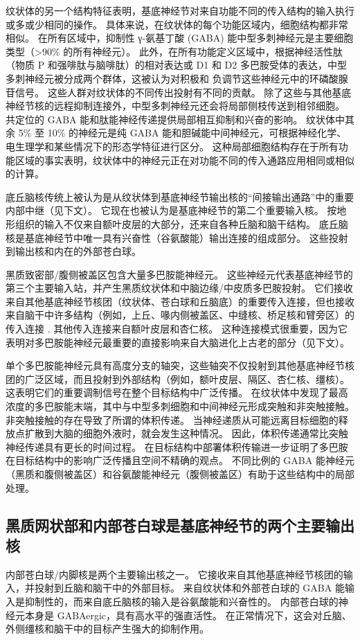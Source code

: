 纹状体的另一个结构特征表明，基底神经节对来自功能不同的传入结构的输入执行或多或少相同的操作。 具体来说，在纹状体的每个功能区域内，细胞结构都非常相似。 在所有区域中，抑制性 γ-氨基丁酸 (GABA) 能中型多刺神经元是主要细胞类型（>90\% 的所有神经元）。 此外，在所有功能定义区域中，根据神经活性肽（物质 P 和强啡肽与脑啡肽）的相对表达或 D1 和 D2 多巴胺受体的表达，中型多刺神经元被分成两个群体，这被认为对积极和 负调节这些神经元中的环磷酸腺苷信号。 这些人群对纹状体的不同传出投射有不同的贡献。 除了这些与其他基底神经节核的远程抑制连接外，中型多刺神经元还会将局部侧枝传送到相邻细胞。 共定位的 GABA 能和肽能神经传递提供局部相互抑制和兴奋的影响。 纹状体中其余 5\% 至 10\% 的神经元是纯 GABA 能和胆碱能中间神经元，可根据神经化学、电生理学和某些情况下的形态学特征进行区分。 这种局部细胞结构存在于所有功能区域的事实表明，纹状体中的神经元正在对功能不同的传入通路应用相同或相似的计算。

底丘脑核传统上被认为是从纹状体到基底神经节输出核的“间接输出通路”中的重要内部中继（见下文）。 它现在也被认为是基底神经节的第二个重要输入核。 按地形组织的输入不仅来自额叶皮层的大部分，还来自各种丘脑和脑干结构。 底丘脑核是基底神经节中唯一具有兴奋性（谷氨酸能）输出连接的组成部分。 这些投射到输出核和内在的外部苍白球。

黑质致密部/腹侧被盖区包含大量多巴胺能神经元。 这些神经元代表基底神经节的第三个主要输入站，并产生黑质纹状体和中脑边缘/中皮质多巴胺投射。 它们接收来自其他基底神经节核团（纹状体、苍白球和丘脑底）的重要传入连接，但也接收来自脑干中许多结构（例如，上丘、喙内侧被盖区、中缝核、桥足核和臂旁区）的传入连接 . 其他传入连接来自额叶皮层和杏仁核。 这种连接模式很重要，因为它表明对多巴胺能神经元最重要的直接影响来自大脑进化上古老的部分（见下文）。

单个多巴胺能神经元具有高度分支的轴突，这些轴突不仅投射到其他基底神经节核团的广泛区域，而且投射到外部结构（例如，额叶皮层、隔区、杏仁核、缰核）。 这表明它们的重要调制信号在整个目标结构中广泛传播。 在纹状体中发现了最高浓度的多巴胺能末端，其中与中型多刺细胞和中间神经元形成突触和非突触接触。 非突触接触的存在导致了所谓的体积传递。 当神经递质从可能远离目标细胞的释放点扩散到大脑的细胞外液时，就会发生这种情况。 因此，体积传递通常比突触神经传递具有更长的时间过程。 在目标结构中部署体积传输进一步证明了多巴胺在目标结构中的影响广泛传播且空间不精确的观点。 不同比例的 GABA 能神经元（黑质和腹侧被盖区）和谷氨酸能神经元（腹侧被盖区）有助于这些结构中的局部处理。

\subsection{黑质网状部和内部苍白球是基底神经节的两个主要输出核}
内部苍白球/内脚核是两个主要输出核之一。 它接收来自其他基底神经节核团的输入，并投射到丘脑和脑干中的外部目标。 来自纹状体和外部苍白球的 GABA 能输入是抑制性的，而来自底丘脑核的输入是谷氨酸能和兴奋性的。 内部苍白球的神经元本身是 GABAergic，具有高水平的强直活性。 在正常情况下，这会对丘脑、外侧缰核和脑干中的目标产生强大的抑制作用。

